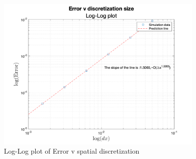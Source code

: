 \documentclass[11pt]{article}
\begin{document}
\begin{enumerate}
\begin{enumerate}
     \begin{figure}[htp]
     \begin{center}
     \includegraphics[width=4in]{Err_plot}
     \end{center}
     \caption{Log-Log plot of Error v spatial discretization}
     \label{fig:q4}
     \end{figure} 
      
    \end{enumerate}
\end{enumerate}
\end{document}
